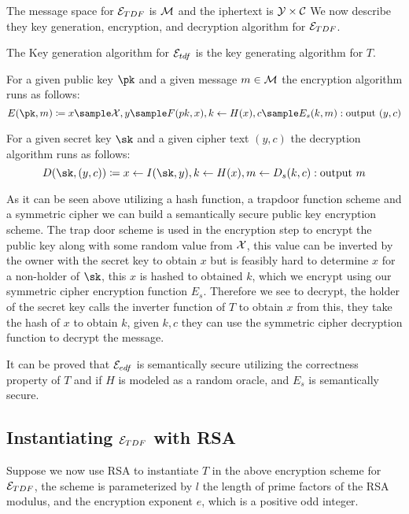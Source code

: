 The message space for \(\mathcal{E}_{TDF}\) is \( \mathcal{M}\) and the iphertext is \(\mathcal{Y} \times \mathcal{C}\) We now describe they key generation, encryption, and decryption algorithm for \(\mathcal{E}_{TDF}\). 

The Key generation algorithm for \(\mathcal{E}_{tdf}\) is the key generating algorithm for \(T\). 

For a given public key \(\pk\) and a given message \(m \in \mathcal{M}\) the encryption algorithm runs as follows: 
    \[
        E(\pk, m) \coloneqq  x \sample \X, y \sample F(pk, x), k \gets H(x), c \sample E_s(k, m): \text{output } (y, c)
    \]

    For a given secret key \(\sk\) and a given cipher text \((y,c)\) the decryption algorithm runs as follows: 
    \[
        D(\sk, (y, c)) \coloneqq  x \gets I(\sk, y), k \gets H(x), m \gets D_s(k, c): \text{output } m 
    \]   

\begin{remark}
    As it can be seen above utilizing a hash function, a trapdoor function scheme and a symmetric cipher we can build a semantically secure public key encryption scheme. The trap door scheme is used in the encryption step to encrypt the public key along with some random value from \(\mathcal{X}\), this value can be inverted by the owner with the secret key to obtain \(x\) but is feasibly hard to determine \(x\) for a non-holder of \(\sk\), this \(x\) is hashed to obtained \(k\), which we encrypt using our symmetric cipher encryption function \(E_s\). Therefore we see to decrypt, the holder of the secret key calls the inverter function of \(T\) to obtain \(x\) from this, they take the hash of \(x\) to obtain \(k\), given \(k, c\) they can use the symmetric cipher decryption function to decrypt the message.            
\end{remark}

It can be proved that \(\mathcal{E}_{edf}\) is semantically secure utilizing the correctness property of \(T\) and if \(H\) is modeled as a random oracle, and \(E_{s}\) is semantically secure.  

\subsection{Instantiating \(\mathcal{E}_{TDF}\) with RSA }

Suppose we now use RSA to instantiate \(T\) in the above encryption scheme for \(\mathcal{E}_{TDF}\), the scheme is parameterized by \(l\) the length of prime factors of the RSA modulus, and the encryption exponent \(e\), which is a positive odd integer. 

